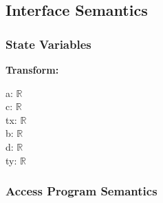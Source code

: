 \documentclass[12pt]{article}
\newcommand{\R}{$\mathbb{R}$}
\begin{document}
\pagebreak %

\subsection{Interface Semantics}

\subsubsection{State Variables} \label{SecSVTransform}
\textbf{Transform:} 
\begin{multicols}{2}
	\noindent a: \R \\
	c: \R \\
	tx: \R \\
	b: \R \\
	d: \R \\
	ty: \R
\end{multicols}



\subsubsection{Access Program Semantics} \label{SecAPSTransform}
\end{document}
